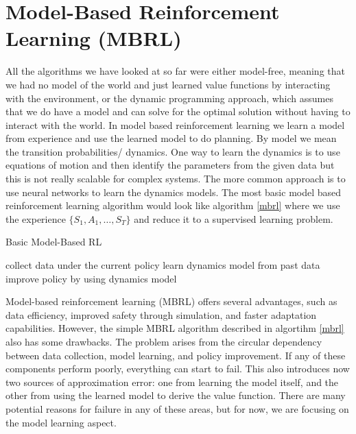 \section{Model-Based Reinforcement Learning (MBRL)}
All the algorithms we have looked at so far were either model-free, meaning that we 
had no model of the world and just learned value functions by interacting with the 
environment, or the dynamic programming approach, which assumes that we do have a 
model and can solve for the optimal solution without having to interact with the world. \newline
In model based reinforcement learning we learn a model from experience and use the 
learned model to do planning. By model we mean the transition probabilities/ dynamics. 
One way to learn the dynamics is to use equations of motion and then 
identify the parameters from the given data but this is not really scalable for 
complex systems. The more common approach is to use neural networks to learn the 
dynamics models. The most basic model based reinforcement learning 
algorithm would look like algorithm \ref{mbrl} where we use the experience $\{S_1,A_1,\dots,S_T\}$ 
and reduce it to a supervised learning problem.
\begin{algorithm}[H]
  \large
    \caption{Basic Model-Based RL}\label{mbrl}
    \begin{algorithmic}
        \STATE collect data under the current policy
        \STATE learn dynamics model from past data
        \STATE improve policy by using dynamics model
        \ENDFOR
    \end{algorithmic}
\end{algorithm}
Model-based reinforcement learning (MBRL) offers several advantages, such as data 
efficiency, improved safety through simulation, and faster adaptation capabilities. 
However, the simple MBRL algorithm described in algortihm \ref{mbrl} also has some 
drawbacks. The problem arises from the circular dependency between data 
collection, model learning, and policy improvement. If any of these components perform 
poorly, everything can start to fail. This also introduces now two sources of approximation error: one 
from learning the model itself, and the other from using the learned model to derive the 
value function. There are many potential reasons for failure in any 
of these areas, but for now, we are focusing on the model learning aspect.

